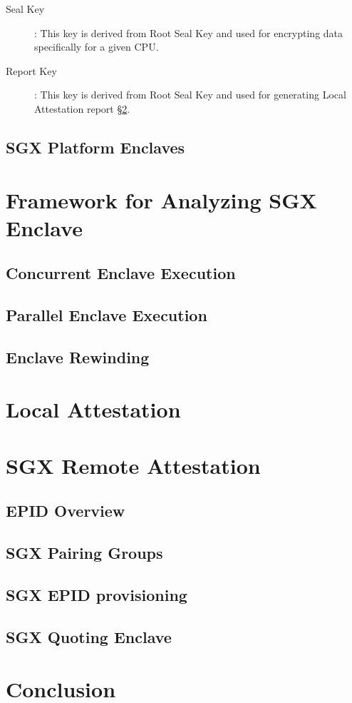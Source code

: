 \documentclass[11pt]{article}
\newcommand{\secref}[1]{\S\ref{#1}}
\begin{document}
\begin{description}
      \item[Seal Key]: This key is derived from Root Seal Key and used
      for encrypting data specifically for a given CPU.

      \item[Report Key]: This key is derived from Root Seal Key and used 
      for generating Local Attestation report \secref{sec:localatt}.

  \end{description}

  \subsection{SGX Platform Enclaves}
  

  \section{Framework for Analyzing SGX Enclave}
  \subsection{Concurrent Enclave Execution}
  \subsection{Parallel Enclave Execution}
  \subsection{Enclave Rewinding}

  \section{Local Attestation}
  \label{sec:localatt}

  \section{SGX Remote Attestation}
  \label{sec:remoteatt}

  \subsection{EPID Overview}
  \label{ssec:epid}

  \subsection{SGX Pairing Groups}
  \label{ssec:pairings}

  \subsection{SGX EPID provisioning}
  \label{ssec:epidprov}
  
  \subsection{SGX Quoting Enclave}
  \label{ssec:qe}

  \section{Conclusion}
  \label{sec:conclusion}



\end{document}
